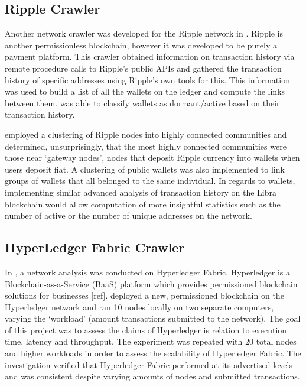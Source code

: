 \documentclass[12pt,openany,a4paper]{book}
\begin{document}
\subsection{Ripple Crawler}
\label{pp2}
\cite{ripple_crawler}
Another network crawler was developed for the Ripple network 
in \cite{ripple_crawler}. Ripple is another permissionless blockchain, 
however it was developed to be purely a payment platform. This crawler obtained 
information on transaction history via remote procedure calls to Ripple’s 
public APIs and gathered the transaction history of specific addresses using 
Ripple’s own tools for this. This information was used to build a list of all 
the wallets on the ledger and compute the links between 
them. \cite{ripple_crawler} was able to classify wallets as dormant/active 
based on their transaction history. 

\cite{ripple_crawler} employed a clustering of Ripple nodes into highly 
connected communities and determined, unsurprisingly, that the most highly 
connected communities were those near ‘gateway nodes’, nodes that deposit 
Ripple currency into wallets when users deposit fiat. A clustering of public 
wallets was also implemented to link groups of wallets that all belonged to the 
same individual. In regards to wallets, implementing similar advanced analysis 
of transaction history on the Libra blockchain would allow computation of more 
insightful statistics such as the number of active  or the number of unique 
addresses on the network.


\subsection{HyperLedger Fabric Crawler}
\label{pp3}

In \cite{hyperledger_analysis}, a network analysis was conducted on Hyperledger 
Fabric. Hyperledger is a Blockchain-as-a-Service (BaaS) platform which provides 
permissioned blockchain solutions for businesses 
[ref]. \cite{hyperledger_analysis} deployed a new, permissioned blockchain on 
the Hyperledger network and ran 10 nodes locally on two separate computers, 
varying the ‘workload’ (amount transactions submitted to the network). The goal 
of this project was to assess the claims of Hyperledger is relation to 
execution time, latency and throughput. The experiment was repeated with 20 
total nodes and higher workloads in order to assess the scalability of 
Hyperledger Fabric. The investigation verified that Hyperledger Fabric 
performed at its advertised levels and was consistent despite varying amounts 
of nodes and submitted transactions. 
\end{document}
